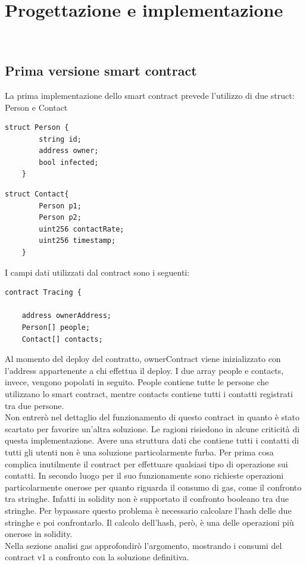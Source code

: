 
\chapter{Progettazione e implementazione}
\label{cap:progettazione-codifica}

\\

\section{Prima versione smart contract}

La prima implementazione dello smart contract prevede l'utilizzo di due struct: Person e Contact

\begin{lstlisting}[language=Solidity]
    struct Person {
        string id;
        address owner;
        bool infected;
    }
\end{lstlisting}
\begin{lstlisting}[language=Solidity]
    struct Contact{
        Person p1;
        Person p2;
        uint256 contactRate;
        uint256 timestamp;
    }
\end{lstlisting}

I campi dati utilizzati dal contract sono i seguenti:
\begin{lstlisting}[language=Solidity]
contract Tracing {
    
    address ownerAddress;
    Person[] people;
    Contact[] contacts;

\end{lstlisting}
Al momento del deploy del contratto, ownerContract viene inizializzato con l’address appartenente a chi effettua il deploy.
I due array people e contacts, invece, vengono popolati in seguito.
People contiene tutte le persone che utilizzano lo smart contract, mentre contacts contiene tutti i contatti registrati tra due persone.\\
Non entrerò nel dettaglio del funzionamento di questo contract in quanto è stato scartato per favorire un’altra soluzione. Le ragioni risiedono in alcune criticità di questa implementazione. Avere una struttura dati che contiene tutti i contatti di tutti gli utenti non è una soluzione particolarmente furba. Per prima cosa complica inutilmente il contract per effettuare qualsiasi tipo di operazione sui contatti. In secondo luogo per il suo funzionamente sono richieste operazioni particolarmente onerose per quanto riguarda il consumo di gas, come il confronto tra stringhe. Infatti in solidity non è supportato il confronto booleano tra due stringhe. Per bypassare questo problema è necessario calcolare l’hash delle due stringhe e poi confrontarlo. Il calcolo dell’hash, però, è una delle operazioni più onerose in solidity.\\
Nella sezione analisi gas approfondirò l’argomento, mostrando i consumi del contract v1 a confronto con la soluzione definitiva.

